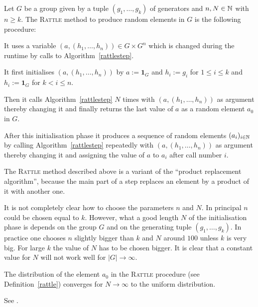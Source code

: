\begin{Def}
    \label{rattle}
%
Let $G$ be a group given by a tuple $(g_1, \ldots, g_k)$ of generators
and $n, N \in \mathbb{N}$ with $n \ge k$. The \textsc{Rattle} method to
produce random elements in $G$ is the following procedure:

It uses a variable $(a,(h_1,\ldots,h_n)) \in G \times G^n$
which is changed during the runtime by calls to
Algorithm~\ref{rattlestep}.

It first initialises $(a,(h_1,\ldots,h_n))$
by $a := \mathbf{1}_G$ and $h_i := g_i$ for $1 \le i \le k$ and $h_i
:= \mathbf{1}_G$ for $k < i \le n$.

Then it calls Algorithm~\ref{rattlestep} $N$
times with $(a,(h_1, \ldots, h_n))$ as argument
thereby changing it and
finally returns the last value of $a$ as a random element $a_0$ in $G$.

After this initialisation phase it produces a sequence of random
elements $(a_i)_{i \in \mathbb{N}}$ by calling 
Algorithm~\ref{rattlestep} repeatedly with 
$(a,(h_1, \ldots, h_n))$ as argument thereby changing it and
assigning the value of $a$ to $a_i$ after call number $i$.
\end{Def}

\begin{Rem}
%
The \textsc{Rattle} method described above is a variant of the
``product replacement algorithm'', because the main part of a step replaces 
an element by a product of it with another one.
\end{Rem}

\begin{Rem}
%
It is not completely clear how to choose the parameters $n$ and $N$. In
principal $n$ could be chosen equal to $k$. However, what a good length
$N$ of the initialisation phase is depends on the group $G$ and
on the generating tuple $(g_1, \ldots, g_k)$. In practice one chooses $n$
slightly bigger than $k$ and $N$ around $100$ unless $k$ is very big.
For large $k$ the value of $N$ has to be chosen bigger. It is clear
that a constant value for $N$ will not work well for $|G| \to \infty$.
\end{Rem}

\begin{Prop}
    \label{proprattle}
%
    The distribution of the element $a_0$ in the \textsc{Rattle} procedure (see
    Definition~\ref{rattle}) converges for $N \to \infty$ to the
    uniform distribution.
\end{Prop}
\proofbeg
See \cite[Section~4]{LGMurray}.
\proofend

